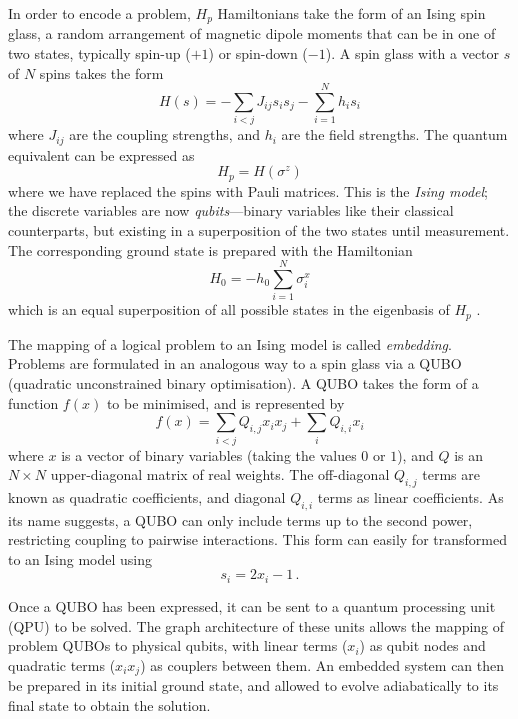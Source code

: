 \documentclass[12pt]{article}
\begin{document}
In order to encode a problem, $H_p$ Hamiltonians take the form of an Ising spin glass, a random arrangement of magnetic dipole moments that can be in one of two states, typically spin-up ($+1$) or spin-down ($-1$). A spin glass with a vector $s$ of $N$ spins takes the form
\begin{equation}
    H(s) = -\sum_{i<j}J_{ij}s_i s_j - \sum_{i=1}^{N}h_i s_i
    \label{eq:ising}
\end{equation}
where $J_{ij}$ are the coupling strengths, and $h_i$ are the field strengths. The quantum equivalent can be expressed as
\begin{equation}
    H_p = H(\sigma^z)
\end{equation}
where we have replaced the spins with Pauli matrices. This is the \textit{Ising model}; the discrete variables are now \textit{qubits}—binary variables like their classical counterparts, but existing in a superposition of the two states until measurement. The corresponding ground state is prepared with the Hamiltonian 
\begin{equation}
    H_0 = -h_0\sum_{i=1}^{N}\sigma_i^x
\end{equation}
which is an equal superposition of all possible states in the eigenbasis of $H_p$ .

The mapping of a logical problem to an Ising model is called \textit{embedding}. Problems are formulated in an analogous way to a spin glass via a QUBO (quadratic unconstrained binary optimisation). A QUBO takes the form of a function $f(x)$ to be minimised, and is represented by
\begin{equation}
    f(x)=\sum_{i<j}Q_{i,j}x_ix_j + \sum_iQ_{i,i}x_i
    \label{eq:QUBO}
\end{equation}
where $x$ is a vector of binary variables (taking the values $0$ or $1$), and $Q$ is an $N\times N$ upper-diagonal matrix of real weights. The off-diagonal $Q_{i,j}$ terms are known as quadratic coefficients, and diagonal $Q_{i,i}$ terms as linear coefficients. As its name suggests, a QUBO can only include terms up to the second power, restricting coupling to pairwise interactions.
This form can easily for transformed to an Ising model using
\begin{equation}
    s_i = 2x_i - 1 \,.
    \label{eq:qubo-ising}
\end{equation}

Once a QUBO has been expressed, it can be sent to a quantum processing unit (QPU) to be solved. The graph architecture of these units allows the mapping of problem QUBOs to physical qubits, with linear terms ($x_i$) as qubit nodes and quadratic terms ($x_ix_j$) as couplers between them. An embedded system can then be prepared in its initial ground state, and allowed to evolve adiabatically to its final state to obtain the solution.
\end{document}

